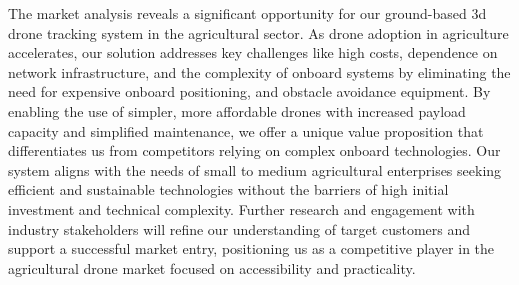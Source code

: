The market analysis reveals a significant opportunity for our ground-based \acrshort{3d} drone tracking system in the agricultural sector. As drone adoption in agriculture accelerates, our solution addresses key challenges like high costs, dependence on network infrastructure, and the complexity of onboard systems by eliminating the need for expensive onboard positioning, and obstacle avoidance equipment. By enabling the use of simpler, more affordable drones with increased payload capacity and simplified maintenance, we offer a unique value proposition that differentiates us from competitors relying on complex onboard technologies. Our system aligns with the needs of small to medium agricultural enterprises seeking efficient and sustainable technologies without the barriers of high initial investment and technical complexity. Further research and engagement with industry stakeholders will refine our understanding of target customers and support a successful market entry, positioning us as a competitive player in the agricultural drone market focused on accessibility and practicality.
